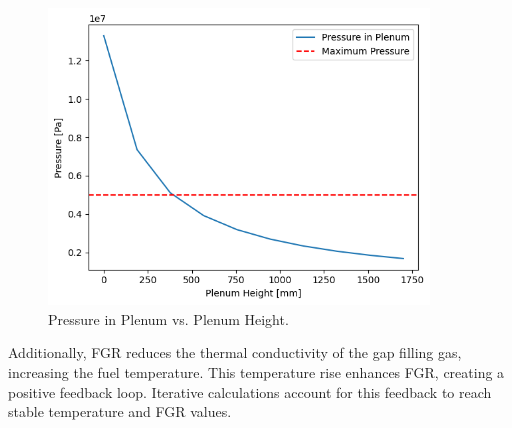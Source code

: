 \begin{figure}[H]
    \centering
    \includegraphics[width=0.9\textwidth]{FGR_3.png}
    \caption{Pressure in Plenum vs. Plenum Height.}
    \label{fig:plenum_pressure}
\end{figure}

Additionally, FGR reduces the thermal conductivity of the gap filling gas, increasing the fuel temperature. This temperature rise enhances FGR, creating a positive feedback loop. Iterative calculations account for this feedback to reach stable temperature and FGR values.
